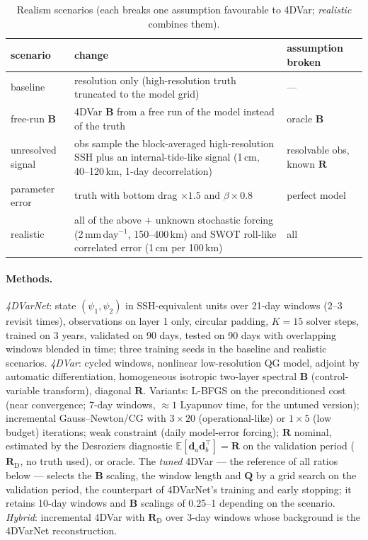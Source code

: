\documentclass[10pt,a4paper]{article}
\newcommand{\B}{\mathbf{B}}
\newcommand{\R}{\mathbf{R}}
\newcommand{\E}{\mathbb{E}}
\begin{document}
\begin{table}[t]\centering\small
\caption{Realism scenarios (each breaks one assumption favourable to 4DVar; \emph{realistic} combines them).}
\label{tab:scen}
\begin{tabular}{p{2.6cm}p{8.6cm}p{3.6cm}}\toprule
scenario & change & assumption broken\\\midrule
baseline & resolution only (high-resolution truth truncated to the model grid) & --- \\
free-run $\B$ & 4DVar $\B$ from a free run of the model instead of the truth & oracle $\B$ \\
unresolved signal & obs sample the block-averaged high-resolution SSH plus an internal-tide-like signal
(1\,cm, 40--120\,km, 1-day decorrelation) & resolvable obs, known $\R$ \\
parameter error & truth with bottom drag $\times1.5$ and $\beta\times0.8$ & perfect model \\
realistic & all of the above $+$ unknown stochastic forcing (2\,mm\,day$^{-1}$, 150--400\,km) and SWOT roll-like
correlated error (1\,cm per 100\,km) & all \\\bottomrule
\end{tabular}
\end{table}

\paragraph{Methods.} \emph{4DVarNet}: state $(\psi_1,\psi_2)$ in SSH-equivalent units over 21-day windows
(2--3 revisit times), observations on layer 1 only, circular padding, $K=15$ solver steps, trained on 3 years,
validated on 90 days, tested on 90 days with overlapping windows blended in time; three training seeds in the
baseline and realistic scenarios.
\emph{4DVar}: cycled windows, nonlinear low-resolution QG model, adjoint by automatic differentiation, homogeneous
isotropic two-layer spectral $\B$ (control-variable transform), diagonal $\R$.
Variants: L-BFGS on the preconditioned cost (near convergence; 7-day windows, $\approx1$ Lyapunov time, for the
untuned version); incremental Gauss--Newton/CG with $3\times20$ (operational-like) or $1\times5$ (low budget)
iterations; weak constraint (daily model-error forcing); $\R$ nominal, estimated by the Desroziers diagnostic
$\E[\mathbf{d}_a\mathbf{d}_b^\top]=\R$ on the validation period \citep{desroziers2005diagnosis} ($\R_{\mathrm D}$, no
truth used), or oracle. The \emph{tuned} 4DVar --- the reference of all ratios below --- selects the $\B$ scaling, the
window length and $\mathbf{Q}$ by a grid search on the validation period, the counterpart of 4DVarNet's training and
early stopping; it retains 10-day windows and $\B$ scalings of 0.25--1 depending on the scenario.
\emph{Hybrid}: incremental 4DVar with $\R_{\mathrm D}$ over 3-day windows whose background is the 4DVarNet
reconstruction.
\end{document}
